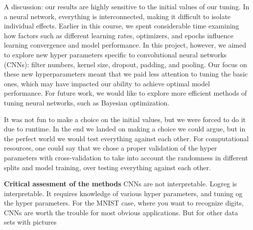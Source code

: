 A discussion: our results are highly sensitive to the initial values of our tuning. In a neural network, everything is interconnected, making it difficult to isolate individual effects. Earlier in this course, we spent considerable time examining how factors such as different learning rates, optimizers, and epochs influence learning convergence and model performance. In this project, however, we aimed to explore new hyper parameters specific to convolutional neural networks (CNNs): filter numbers, kernel size, dropout, padding, and pooling. Our focus on these new hyperparameters meant that we paid less attention to tuning the basic ones, which may have impacted our ability to achieve optimal model performance. For future work, we would like to explore more efficient methods of tuning neural networks, such as Bayesian optimization.

It was not fun to make a choice on the initial values, but we were forced to do it due to runtime. In the end we landed on making a choice we could argue, but in the perfect world we would test everything against each other. For computational resources, one could say that we chose a proper validation of the hyper parameters with cross-validation to take into account the randomness in different splits and model training, over testing everything against each other. 

\textbf{Critical assesment of the methods}
CNNs are not interpretable. Logreg is interpretable. It requires knowledge of various hyper parameters, and tuning og the hyper parameters. For the MNIST case, where you want to recognize digits, CNNs are worth the trouble for most obvious applications. But for other data sets with pictures

